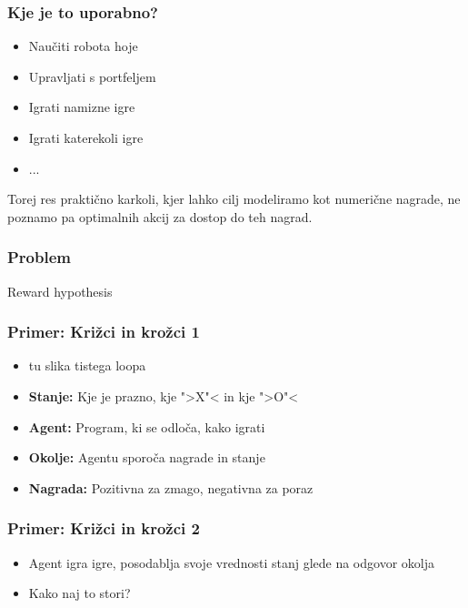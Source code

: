 \documentclass{beamer}    %
\begin{document}
\begin{frame}
    \frametitle{Kje je to uporabno?}
    \begin{itemize}
        \item Naučiti robota hoje
        \item Upravljati s portfeljem
        \item Igrati namizne igre
        \item Igrati katerekoli igre
        \item ...
    \end{itemize}
    Torej res praktično karkoli, kjer lahko cilj modeliramo kot numerične
    nagrade, ne poznamo pa optimalnih akcij za dostop do teh nagrad.
\end{frame}


\begin{frame}
    \frametitle{Problem}
    Reward hypothesis
\end{frame}


\begin{frame}
    \frametitle{Primer: Križci in krožci 1}
    \begin{itemize}
        \item tu slika tistega loopa
        \item \textbf{Stanje:} Kje je prazno, kje ">X"< in kje ">O"<
        \item \textbf{Agent:} Program, ki se odloča, kako igrati
        \item \textbf{Okolje:} Agentu sporoča nagrade in stanje
        \item \textbf{Nagrada:} Pozitivna za zmago, negativna za poraz
    \end{itemize}
\end{frame}


\begin{frame}
    \frametitle{Primer: Križci in krožci 2}
    \begin{itemize}
        \item Agent igra igre, posodablja svoje vrednosti stanj glede na odgovor okolja
        \item Kako naj to stori?
    \end{itemize}
\end{frame}
\end{document}
